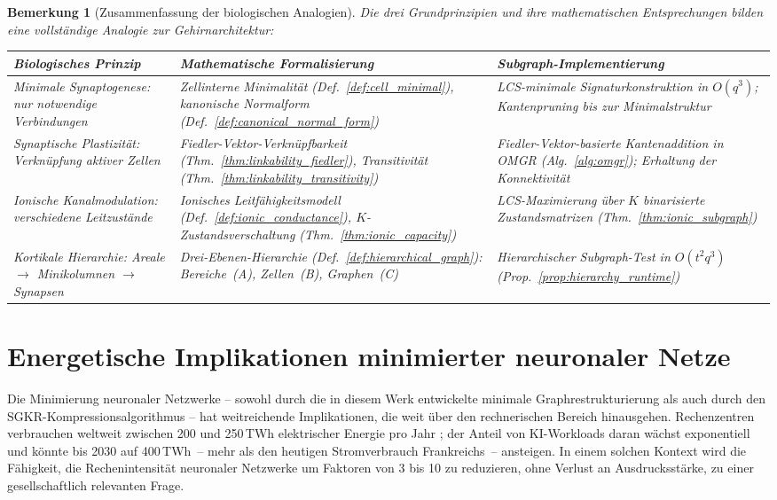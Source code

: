 \documentclass[12pt, a4paper, openany]{report}
\newtheorem{remark}[theorem]{Bemerkung}
\begin{document}
\begin{remark}[Zusammenfassung der biologischen Analogien]
\label{rem:bio_summary}
Die drei Grundprinzipien und ihre mathematischen Entsprechungen bilden
eine vollständige Analogie zur Gehirnarchitektur:

\begin{center}
\renewcommand{\arraystretch}{1.4}
\begin{tabular}{p{3.2cm}|p{4.5cm}|p{5.2cm}}
\hline
\textbf{Biologisches Prinzip} & \textbf{Mathematische Formalisierung} & \textbf{Subgraph-Implementierung} \\
\hline
Minimale Synaptogenese: nur notwendige Verbindungen & Zellinterne Minimalität (Def.~\ref{def:cell_minimal}), kanonische Normalform (Def.~\ref{def:canonical_normal_form}) & LCS-minimale Signaturkonstruktion in $O(q^3)$; Kantenpruning bis zur Minimalstruktur \\
\hline
Synaptische Plastizität: Verknüpfung aktiver Zellen & Fiedler-Vektor-Verknüpfbarkeit (Thm.~\ref{thm:linkability_fiedler}), Transitivität (Thm.~\ref{thm:linkability_transitivity}) & Fiedler-Vektor-basierte Kantenaddition in OMGR (Alg.~\ref{alg:omgr}); Erhaltung der Konnektivität \\
\hline
Ionische Kanalmodulation: verschiedene Leitzustände& Ionisches Leitfähigkeitsmodell (Def.~\ref{def:ionic_conductance}), $K$-Zustandsverschaltung (Thm.~\ref{thm:ionic_capacity}) & LCS-Maximierung über $K$ binarisierte Zustandsmatrizen (Thm.~\ref{thm:ionic_subgraph}) \\
\hline
Kortikale Hierarchie: Areale $\to$ Minikolumnen $\to$ Synapsen & Drei-Ebenen-Hierarchie (Def.~\ref{def:hierarchical_graph}): Bereiche~(A), Zellen~(B), Graphen~(C) & Hierarchischer Subgraph-Test in $O(t^2 q^3)$ (Prop.~\ref{prop:hierarchy_runtime}) \\
\hline
\end{tabular}
\end{center}
\end{remark}

\chapter{Energetische Implikationen minimierter neuronaler Netze}
\label{chap:energy}

Die Minimierung neuronaler Netzwerke -- sowohl durch die in diesem Werk
entwickelte minimale Graphrestrukturierung als auch durch den
SGKR-Kompressions\-algorithmus -- hat weitreichende Implikationen, die weit
über den rechnerischen Bereich hinausgehen.  Rechenzentren verbrauchen
weltweit zwischen 200 und 250\,TWh elektrischer Energie pro Jahr
\citep{iea2024}; der Anteil von KI-Workloads daran
wächst exponentiell und könnte bis 2030 auf 400\,TWh~-- mehr als den
heutigen Stromverbrauch Frankreichs~-- ansteigen.  In einem solchen Kontext
wird die Fähigkeit, die Rechenintensität neuronaler Netzwerke um Faktoren
von 3 bis 10 zu reduzieren, ohne Verlust an Ausdrucksstärke, zu einer
gesellschaftlich relevanten Frage.
\end{document}
